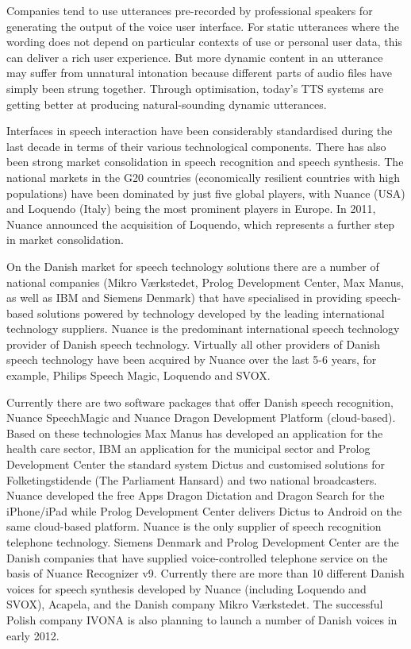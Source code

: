 \begin{multicols}{2}

Companies tend to use utterances pre-recorded by professional speakers for generating the output of the voice user interface. For static utterances where the wording does not depend on particular contexts of use or personal user data, this can deliver a rich user experience. But more dynamic content in an utterance may suffer from unnatural intonation because different parts of audio files have simply been strung together. Through optimisation, today’s TTS systems are getting better at producing natural-sounding dynamic utterances.

Interfaces in speech interaction have been considerably standardised during the last decade in terms of their various technological components. There has also been strong market consolidation in speech recognition and speech synthesis. The national markets in the G20 countries (economically resilient countries with high populations) have been dominated by just five global players, with Nuance (USA) and Loquendo (Italy) being the most prominent players in Europe. In 2011, Nuance announced the acquisition of Loquendo, which represents a further step in market consolidation.

On the Danish market for speech technology solutions there are a
number of national companies (Mikro V\ae rkstedet, Prolog Development
Center, Max Manus, as well as IBM and Siemens Denmark) that have
specialised in providing speech-based solutions powered by technology
developed by the leading international technology suppliers. Nuance is
the predominant international speech technology provider of Danish
speech technology. Virtually all other providers of Danish speech
technology have been acquired by Nuance over the last 5-6 years, for
example, Philips Speech Magic, Loquendo and SVOX.

Currently there are two software packages that offer Danish speech
recognition, Nuance SpeechMagic and Nuance Dragon Development Platform
(cloud-based). Based on these technologies Max Manus has developed an
application for the health care sector, IBM an application for the
municipal sector and Prolog Development Center the standard system
Dictus and customised solutions for Folketingstidende (The Parliament
Hansard) and two national broadcasters. Nuance developed the free Apps
Dragon Dictation and Dragon Search for the iPhone/iPad while Prolog
Development Center delivers Dictus to Android on the same cloud-based
platform. Nuance is the only supplier of speech recognition telephone
technology. Siemens Denmark and Prolog Development Center are the
Danish companies that have supplied voice-controlled telephone service
on the basis of Nuance Recognizer v9. 
Currently there are more than 10 different Danish voices for speech
synthesis developed by Nuance (including Loquendo and SVOX), Acapela,
and the Danish company Mikro V\ae rkstedet. The successful Polish
company IVONA is also planning to launch a number of Danish voices in
early 2012.


\end{multicols}
